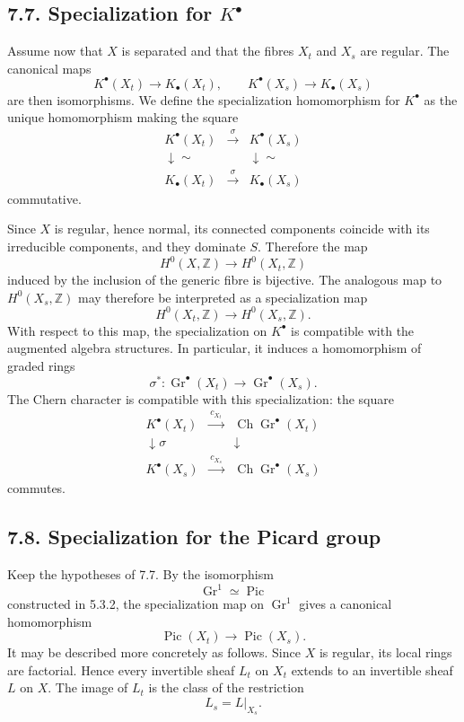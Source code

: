 \documentclass[11pt]{article}
\theoremstyle{plain}
\theoremstyle{definition}
\theoremstyle{remark}
\newcommand{\ZZ}{\mathbb Z}
\DeclareMathOperator{\Pic}{Pic}
\DeclareMathOperator{\Gr}{Gr}
\newcommand{\longto}{\longrightarrow}
\providecommand{\xto}[1]{\xrightarrow{#1}}
\providecommand{\Ch}{\operatorname{Ch}}
\begin{document}
\subsection*{7.7. Specialization for $K^\bullet$}

Assume now that $X$ is separated and that the fibres $X_t$ and $X_s$ are regular. The canonical maps
\[
K^\bullet(X_t)\longto K_\bullet(X_t),
\qquad
K^\bullet(X_s)\longto K_\bullet(X_s)
\]
are then isomorphisms. We define the specialization homomorphism for $K^\bullet$ as the unique homomorphism making the square
\[
\begin{array}{ccc}
K^\bullet(X_t)&\xto{\,\sigma\,}&K^\bullet(X_s)\\
\downarrow\scriptstyle\sim&&\downarrow\scriptstyle\sim\\
K_\bullet(X_t)&\xto{\,\sigma\,}&K_\bullet(X_s)
\end{array}
\]
commutative.

Since $X$ is regular, hence normal, its connected components coincide with its irreducible components, and they dominate $S$. Therefore the map
\[
H^0(X,\ZZ)\longto H^0(X_t,\ZZ)
\]
induced by the inclusion of the generic fibre is bijective. The analogous map to $H^0(X_s,\ZZ)$ may therefore be interpreted as a specialization map
\[
H^0(X_t,\ZZ)\longto H^0(X_s,\ZZ).
\]
With respect to this map, the specialization on $K^\bullet$ is compatible with the augmented algebra structures. In particular, it induces a homomorphism of graded rings
\[
\sigma^*:\Gr^\bullet(X_t)\longto\Gr^\bullet(X_s).
\]
The Chern character is compatible with this specialization: the square
\[
\begin{array}{ccc}
K^\bullet(X_t)&\xto{\,c_{X_t}\,}&\Ch\Gr^\bullet(X_t)\\
\downarrow\scriptstyle\sigma&&\downarrow\\
K^\bullet(X_s)&\xto{\,c_{X_s}\,}&\Ch\Gr^\bullet(X_s)
\end{array}
\]
commutes.

\subsection*{7.8. Specialization for the Picard group}

Keep the hypotheses of 7.7. By the isomorphism
\[
\Gr^1\simeq\Pic
\]
constructed in 5.3.2, the specialization map on $\Gr^1$ gives a canonical homomorphism
\[
\Pic(X_t)\longto\Pic(X_s).
\]
It may be described more concretely as follows. Since $X$ is regular, its local rings are factorial. Hence every invertible sheaf $L_t$ on $X_t$ extends to an invertible sheaf $L$ on $X$. The image of $L_t$ is the class of the restriction
\[
L_s=L|_{X_s}.
\]
\end{document}

